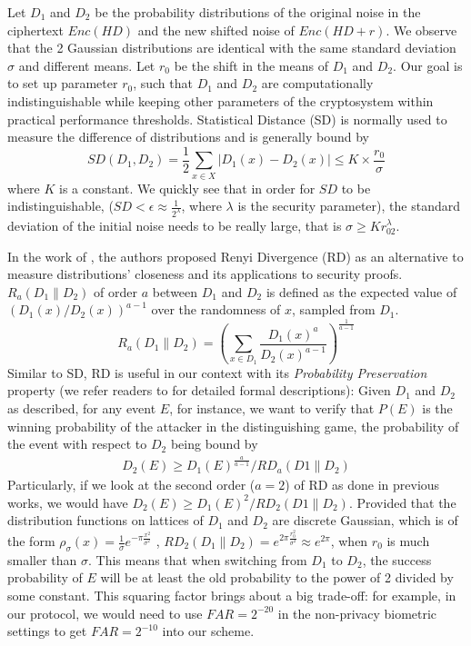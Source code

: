 Let $D_1$ and $D_2$ be the probability distributions of the original noise in the ciphertext $Enc(HD)$ and the new shifted noise of $Enc(HD+r)$. We observe that the
2 Gaussian distributions are identical with the same standard deviation
$\sigma$ and different means. Let $r_0$ be the shift in the means of $D_1$ and $D_2$.
Our goal is to set up parameter $r_0$, such that $D_1$ and $D_2$ are computationally
indistinguishable while keeping other parameters of the cryptosystem within practical
performance
thresholds. Statistical Distance (SD) is normally used to measure the difference of distributions and is generally bound by
\[
SD(D_1, D_2) = \frac{1}{2}\sum_{x\in X}|D_1(x) - D_2(x)| \leq K\times \frac{r_0}
{\sigma}
\]
where $K$ is a constant. We quickly see that in order for $SD$ to be indistinguishable, ($SD < \epsilon \approx \frac{1}{2^\lambda}$, where $\lambda$ is
the security parameter), the standard deviation of the initial noise needs to be really large, that is $\sigma \geq Kr_02^\lambda$.

In the work of \cite{bai2015improved}, the authors proposed Renyi Divergence (RD) as
an alternative to measure distributions' closeness and its applications to security proofs. $R_a(D_1\|D_2)$ of order $a$
between $D_1$ and $D_2$ is defined as the expected value of $(D_1(x)/D_2(x))^{a-1}$ over the randomness of $x$, sampled from $D_1$.
\[
R_a(D_1\|D_2) = \left( \sum_{x \in D_1}\frac{D_1(x)^a}{D_2(x)^{a-1}} \right)^
{\frac{1}{a-1}}
\]
Similar to SD, RD is useful in our context with its \textit{Probability Preservation} property (we refer readers to \cite{bai2015improved} for detailed formal
descriptions): Given $D_1$ and $D_2$ as described, for any event $E$, for instance, we want to verify that $P(E)$ is the winning probability of the attacker in the distinguishing game, the probability of the event with respect to $D_2$ being bound by
\begin{align}
\label{eq:renyi}
D_2(E) \geq D_1(E)^{\frac{a}{a-1}}/RD_a(D1\|D_2)
\end{align}
Particularly, if we look at the second order ($a = 2$) of RD as done in previous
works, we would have $ D_2(E) \geq D_1(E)^2/RD_2(D1\|D_2) $.  Provided that the
distribution functions on lattices of $D_1$ and $D_2$ are discrete Gaussian,
which is of the form
$\rho_\sigma(x) = \frac{1}{\sigma}e^{-\pi\frac{x^2} {\sigma^2}}$ ,
$RD_2(D_1\|D_2) = e^{2\pi \frac{r_0^2}{\sigma^2}} \approx e^{2\pi}$, when $r_0$
is much smaller than $\sigma$. This means that when switching from $D_1$ to $D_2$,
the success probability of $E$ will be at least the old probability to the power
of 2 divided by some constant. This squaring factor brings about a big trade-off: for
example, in our protocol, we would need to use $FAR = 2^{-20}$ in the
non-privacy biometric settings to get $FAR=2^{-10}$ into our scheme.

